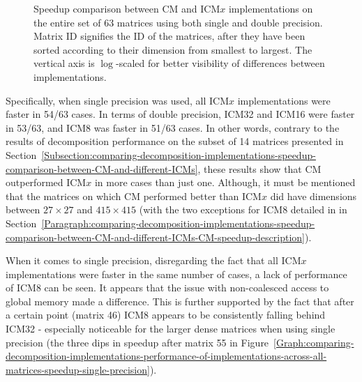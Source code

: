 \begin{figure}[ht!]
\begin{subfigure}{\textwidth}
		\label{Graph:comparing-decomposition-implementations-performance-of-implementations-across-all-matrices-speedup-double-precision}
	\end{subfigure}
	\caption{Speedup comparison between CM and ICM$ x $ implementations on the entire set of 63 matrices using both single and double precision. Matrix ID signifies the ID of the matrices, after they have been sorted according to their dimension from smallest to largest. The vertical axis is $ \log $-scaled for better visibility of differences between implementations.}
	\label{Graph:comparing-decomposition-implementations-performance-of-implementations-across-all-matrices-speedup-single-double-precision}
\end{figure}

Specifically, when single precision was used, all ICM$ x $ implementations were faster in 54/63 cases. In terms of double precision, ICM32 and ICM16 were faster in 53/63, and ICM8 was faster in 51/63 cases. In other words, contrary to the results of decomposition performance on the subset of 14 matrices presented in Section~\ref{Subsection:comparing-decomposition-implementations-speedup-comparison-between-CM-and-different-ICMs}, these results show that CM outperformed ICM$ x $ in more cases than just one. Although, it must be mentioned that the matrices on which CM performed better than ICM$ x $ did have dimensions between $ 27\times 27 $ and $ 415\times 415 $ (with the two exceptions for ICM8 detailed in \textit{} in Section~\ref{Paragraph:comparing-decomposition-implementations-speedup-comparison-between-CM-and-different-ICMs-CM-speedup-description}).

\par When it comes to single precision, disregarding the fact that all ICM$ x $ implementations were faster in the same number of cases, a lack of performance of ICM8 can be seen. It appears that the issue with non-coalesced access to global memory made a difference. This is further supported by the fact that after a certain point (matrix 46) ICM8 appears to be consistently falling behind ICM32 - especially noticeable for the larger dense matrices when using single precision (the three dips in speedup after matrix 55 in Figure~\ref{Graph:comparing-decomposition-implementations-performance-of-implementations-across-all-matrices-speedup-single-precision}).

